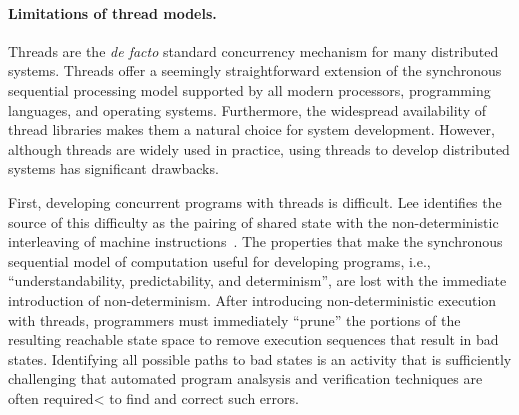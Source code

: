 \paragraph{Limitations of thread models.}
Threads are the \emph{de facto} standard concurrency mechanism for many distributed systems.
Threads offer a seemingly straightforward extension of the synchronous sequential processing model supported by all modern processors, programming languages, and operating systems.
Furthermore, the widespread availability of thread libraries makes them a natural choice for system development.
However, although threads are widely used in practice, using threads to develop distributed systems has significant drawbacks.

First, developing concurrent programs with threads is difficult.
Lee identifies the source of this difficulty as the pairing of shared state with the non-deterministic interleaving of machine instructions~\cite{lee2006problem}.
The properties that make the synchronous sequential model of computation useful for developing programs, i.e., ``understandability, predictability, and determinism'', are lost with the immediate introduction of non-determinism.
After introducing non-deterministic execution with threads, programmers must immediately ``prune'' the portions of the resulting reachable state space to remove execution sequences that result in bad states.
Identifying all possible paths to bad states is an activity that is sufficiently challenging that automated program analsysis and verification techniques are often required< to find and correct such errors.


